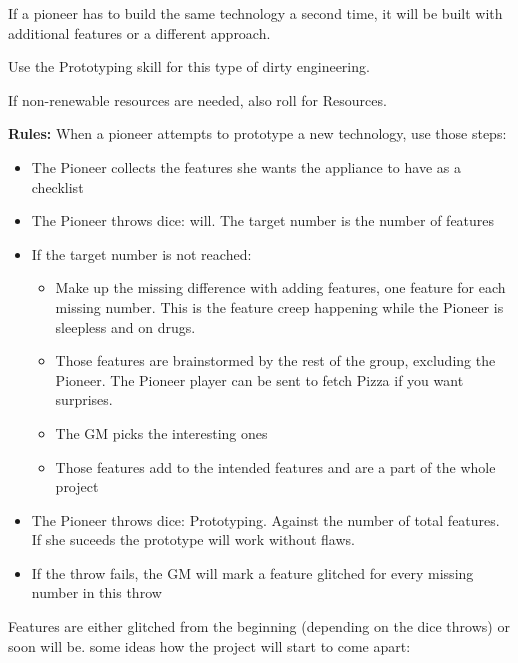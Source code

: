 If a pioneer has to build the same technology a second time, it will be built with additional features or a different approach.

Use the Prototyping skill for this type of dirty engineering.

If non-renewable resources are needed, also roll for Resources.



\textbf{Rules:} When a pioneer attempts to prototype a new technology, use those steps:

\begin{itemize}
    \item {The Pioneer collects the features she wants the appliance to have as a checklist}
    \item {The Pioneer throws dice: will. The target number is the number of features}
    \item {If the target number is not reached:}
    \begin{itemize}
        \item{Make up the missing difference with adding features, one feature for each missing number. This is the feature creep happening while the Pioneer is sleepless and on drugs.}
        \item {Those features are brainstormed by the rest of the group, excluding the Pioneer. The Pioneer player can be sent to fetch Pizza if you want surprises.}
        \item {The GM picks the interesting ones}
        \item {Those features add to the intended features and are a part of the whole project}
    \end{itemize}
    \item{The Pioneer throws dice: Prototyping. Against the number of total features. If she suceeds the prototype will work without flaws.}
    \item{If the throw fails, the GM will mark a feature glitched for every missing number in this throw}
\end{itemize}

Features are either glitched from the beginning (depending on the dice throws) or soon will be. some ideas how the project will start to come apart:

